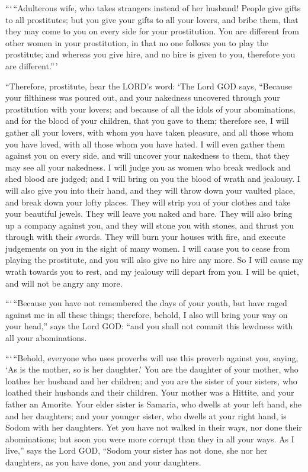  ```\,``Adulterous wife, who takes strangers instead of her
husband!  People give gifts to all prostitutes; but you
give your gifts to all your lovers, and bribe them, that they may come
to you on every side for your prostitution.  You are
different from other women in your prostitution, in that no one follows
you to play the prostitute; and whereas you give hire, and no hire is
given to you, therefore you are different.''\,'

 ``Therefore, prostitute, hear the LORD's word:
 `The Lord GOD says, ``Because your filthiness was poured
out, and your nakedness uncovered through your prostitution with your
lovers; and because of all the idols of your abominations, and for the
blood of your children, that you gave to them;  therefore
see, I will gather all your lovers, with whom you have taken pleasure,
and all those whom you have loved, with all those whom you have hated. I
will even gather them against you on every side, and will uncover your
nakedness to them, that they may see all your nakedness.  I
will judge you as women who break wedlock and shed blood are judged; and
I will bring on you the blood of wrath and jealousy.  I
will also give you into their hand, and they will throw down your
vaulted place, and break down your lofty places. They will strip you of
your clothes and take your beautiful jewels. They will leave you naked
and bare.  They will also bring up a company against you,
and they will stone you with stones, and thrust you through with their
swords.  They will burn your houses with fire, and execute
judgements on you in the sight of many women. I will cause you to cease
from playing the prostitute, and you will also give no hire any more.
 So I will cause my wrath towards you to rest, and my
jealousy will depart from you. I will be quiet, and will not be angry
any more.

 ```\,``Because you have not remembered the days of your
youth, but have raged against me in all these things; therefore, behold,
I also will bring your way on your head,'' says the Lord GOD: ``and you
shall not commit this lewdness with all your abominations.

 ```\,``Behold, everyone who uses proverbs will use this
proverb against you, saying, `As is the mother, so is her daughter.'
 You are the daughter of your mother, who loathes her
husband and her children; and you are the sister of your sisters, who
loathed their husbands and their children. Your mother was a Hittite,
and your father an Amorite.  Your elder sister is Samaria,
who dwells at your left hand, she and her daughters; and your younger
sister, who dwells at your right hand, is Sodom with her daughters.
 Yet you have not walked in their ways, nor done their
abominations; but soon you were more corrupt than they in all your ways.
 As I live,'' says the Lord GOD, ``Sodom your sister has
not done, she nor her daughters, as you have done, you and your
daughters.

